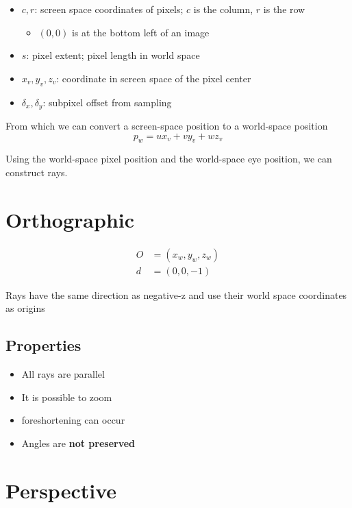   \begin{itemize}
    \item $ c, r $: screen space coordinates of pixels; $ c $ is the column,
    $ r $ is the row
    \begin{itemize}
      \item $ \left( 0, 0 \right) $ is at the bottom left of an image
    \end{itemize}

    \item $ s $: pixel extent; pixel length in world space
    \item $ x_{v}, y_{v}, z_{v} $: coordinate in screen space of the pixel center
    \item $ \delta_{x}, \delta_{y} $: subpixel offset from sampling
  \end{itemize}

  From which we can convert a screen-space position to a world-space position
  \begin{equation}
    p_{w} = u x_{v} + v y_{v} + w z_{v}
  \end{equation}

  Using the world-space pixel position and the world-space eye position,
  we can construct rays.

\section{Orthographic}

  \begin{align}
    O &= \left( x_{w}, y_{w}, z_{w} \right) \\
    d &= \left( 0, 0, -1 \right)
  \end{align}

  Rays have the same direction as negative-z and use their world space
  coordinates as origins

  \subsection{Properties}
  \begin{itemize}
    \item All rays are parallel
    \item It is possible to zoom
    \item \Gls{foreshortening} can occur
    \item Angles are \textbf{not preserved}
  \end{itemize}

\section{Perspective}

